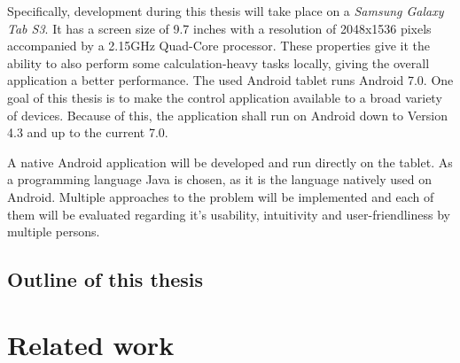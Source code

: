 Specifically, development during this thesis will take place on a \textit{Samsung Galaxy Tab S3}. It has a screen size of 9.7 inches\cite{samsung:galaxytabs3} with a resolution of 2048x1536 pixels accompanied by a 2.15GHz Quad-Core processor. These properties give it the ability to also perform some calculation-heavy tasks locally, giving the overall application a better performance. The used Android tablet runs Android 7.0. One goal of this thesis is to make the control application available to a broad variety of devices. Because of this, the application shall run on Android down to Version 4.3 and up to the current 7.0.

A native Android application will be developed and run directly on the tablet. As a programming language Java is chosen, as it is the language natively used on Android. Multiple approaches to the problem will be implemented and each of them will be evaluated regarding it's usability, intuitivity and user-friendliness by multiple persons.

\section[Outline]{Outline of this thesis}



\chapter{Related work}